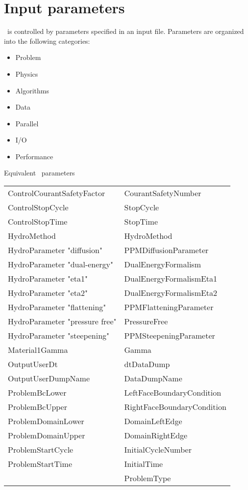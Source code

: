 \documentclass{book}
\begin{document}
\chapter{Input parameters} \label{s:input}

\cello\ is controlled by parameters specified in an input file.  Parameters
are organized into the following categories:

\begin{itemize}
\item Problem
\item Physics
\item Algorithms
\item Data
\item Parallel
\item I/O
\item Performance
\end{itemize}

Equivalent \enzo\ parameters

\begin{tabular}{ll}
ControlCourantSafetyFactor        & CourantSafetyNumber \\
ControlStopCycle           & StopCycle \\
ControlStopTime            & StopTime \\
HydroMethod                & HydroMethod \\
HydroParameter "diffusion"    & PPMDiffusionParameter \\
HydroParameter "dual-energy"  & DualEnergyFormalism \\
HydroParameter "eta1"    & DualEnergyFormalismEta1 \\
HydroParameter "eta2"    & DualEnergyFormalismEta2 \\
HydroParameter "flattening"   & PPMFlatteningParameter \\
HydroParameter "pressure free" & PressureFree \\
HydroParameter "steepening"  & PPMSteepeningParameter \\
Material1Gamma             & Gamma \\
OutputUserDt               & dtDataDump \\
OutputUserDumpName         & DataDumpName \\
ProblemBcLower             & LeftFaceBoundaryCondition \\
ProblemBcUpper             & RightFaceBoundaryCondition \\
ProblemDomainLower         & DomainLeftEdge \\
ProblemDomainUpper         & DomainRightEdge \\
ProblemStartCycle          & InitialCycleNumber \\
ProblemStartTime           & InitialTime \\
                           & ProblemType \\
\end{tabular}
\end{document}
